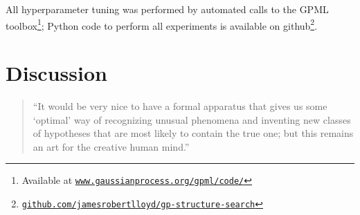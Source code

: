 \documentclass[twoside]{article}
\begin{document}
All \gp{} hyperparameter tuning was performed by automated calls to the GPML toolbox\footnote{Available at 
\href{http://www.gaussianprocess.org/gpml/code/}
{\texttt{www.gaussianprocess.org/gpml/code/}}
}; Python code to perform all experiments is available on github\footnote{
\href{http://www.github.com/jamesrobertlloyd/gp-structure-search}
{\texttt{github.com/jamesrobertlloyd/gp-structure-search}}
}.



\section{Discussion}

\begin{quotation}
``It would be very nice to have a formal apparatus that gives us some `optimal' way of recognizing unusual phenomena and inventing new classes of hypotheses that are most likely to contain the true one; but this remains an art for the creative human mind.''

\hspace*{\fill}


\end{quotation}
\end{document}
